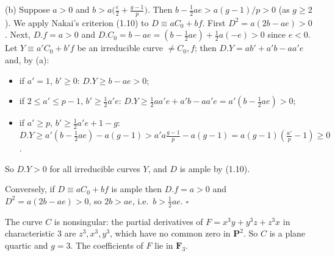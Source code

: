 \documentclass[11pt]{article}
\begin{document}
(b) Suppose $a>0$ and $b>a\bigl(\frac e2+\frac{g-1}p\bigr)$. Then $b-\frac12ae>a(g-1)/p>0$ (as $g\ge2$). We apply Nakai's criterion (1.10) to $D\equiv aC_0+bf$. First $D^2=a(2b-ae)>0$. Next, $D.f=a>0$ and $D.C_0=b-ae=(b-\frac12ae)+\frac12a(-e)>0$ since $e<0$. Let $Y\equiv a'C_0+b'f$ be an irreducible curve $\ne C_0,f$; then $D.Y=ab'+a'b-aa'e$ and, by (a):
\begin{itemize}
\item if $a'=1$, $b'\ge0$: $D.Y\ge b-ae>0$;
\item if $2\le a'\le p-1$, $b'\ge\frac12a'e$: $D.Y\ge\frac12aa'e+a'b-aa'e=a'(b-\frac12ae)>0$;
\item if $a'\ge p$, $b'\ge\frac12a'e+1-g$: $D.Y\ge a'(b-\frac12ae)-a(g-1)>a'a\frac{g-1}p-a(g-1)=a(g-1)(\frac{a'}p-1)\ge0$.
\end{itemize}
So $D.Y>0$ for all irreducible curves $Y$, and $D$ is ample by (1.10).

Conversely, if $D\equiv aC_0+bf$ is ample then $D.f=a>0$ and $D^2=a(2b-ae)>0$, so $2b>ae$, i.e.\ $b>\frac12ae$. \hfill$\square$

\pf
The curve $C$ is nonsingular: the partial derivatives of $F=x^3y+y^3z+z^3x$ in characteristic 3 are $z^3,x^3,y^3$, which have no common zero in $\mathbf P^2$. So $C$ is a plane quartic and $g=3$. The coefficients of $F$ lie in $\mathbf F_3$.
\end{document}
